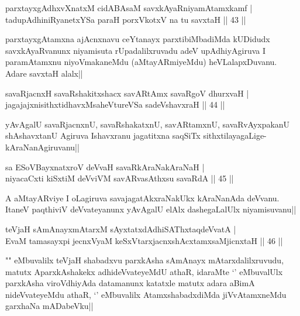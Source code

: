 \begin{shl}
parxtayxgAdhxvXnatxM cidABAsaM savxkAyaRniyamAtamxkamf |\\
tadupAdhiniRyanetxYSa paraH porxVkotxV na tu savxtaH \hfill || 43 ||
\end{shl}

\begin{artha}%
parxtayxgAtamxna ajAcnxnavu ceYtanayx parxtibiMbadiMda kUDidudx savxkAyaRvanunx niyamisuta rUpadalilxruvadu adeV upAdhiyAgiruva I paramAtamxnu niyoVmakaneMdu (aMtayARmiyeMdu) heVLalapxDuvanu. Adare savxtaH alalx||
\end{artha}

\begin{shl}
savaRjacnxH savaRshakitxshacx savARtAmx savaRgoV dhurxvaH |\\
jagajajxnisithxtidhavxMsaheVtureVSa sadeVshavxraH \hfill || 44 ||
\end{shl}

\begin{artha}
yAvAgalU savaRjacnxnU, savaRshakatxnU, savARtamxnU, savaRvAyxpakanU shAshavxtanU Agiruva Ishavxranu jagatitxna saqSiTx sithxtilayagaLige-kAraNanAgiruvanu||
\end{artha}


\begin{shl}
sa ESoV\s BayxnatxroV deVvaH savaRkAraNakAraNaH |\\
niyacaCxti kiSxtiM deVviVM savARvasAthxsu savaRdA \hfill || 45 ||
\end{shl}

\begin{artha}
A aMtayARviye I oLagiruva savajagatAkxraNakUkx kAraNanAda deVvanu. ItaneV paqthiviV deVvateyanunx yAvAgalU elAlx dashegaLalUlx niyamisuvanu||
\end{artha}


\begin{shl}
teVjaH sAmAnayxmAtarxM sAyxtatxdAdhiSAThxtaqdeVvatA |\\
EvaM tamasayxpi jecnxVyaM keSxVtarxjacnxshAcx\s \s tamxsaMjicnxtaH \hfill || 46 ||
\end{shl}

\begin{artha}
"\stext " eMbuvalilx teVjaH shabadxvu parxkAsha sAmAnayx mAtarxdalilxruvudu, matutx AparxkAshakekx adhideVvateyeMdU athaR, idaraMte `\stext ' eMbuvalUlx parxkAsha viroVdhiyAda datamanunx katatxle matutx adara aBimA nideVvateyeMdu athaR, `\stext ' eMbuvalilx AtamxshabadxdiMda jiVvAtamxneMdu garxhaNa mADabeVku||
\end{artha}%

